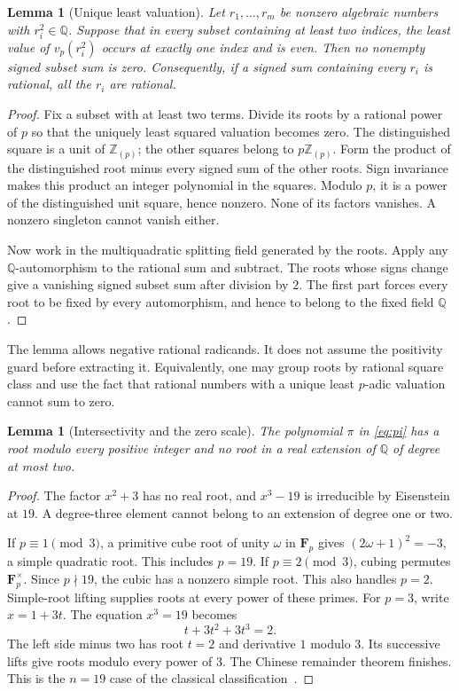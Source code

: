 \documentclass[11pt,a4paper]{article}
\newtheorem{lemma}[theorem]{Lemma}
\theoremstyle{remark}\newtheorem{remark}[theorem]{Remark}
\newcommand{\Z}{\mathbb Z}\newcommand{\Q}{\mathbb Q}\newcommand{\N}{\mathbb N}
\newcommand{\vp}{v_p}\newcommand{\vt}{v_3}
\begin{document}
\begin{lemma}[Unique least valuation]\label{lem:separation}
Let $r_1,\ldots,r_m$ be nonzero algebraic numbers with $r_i^2\in\Q$.
Suppose that in every subset containing at least two indices, the least
value of $\vp(r_i^2)$ occurs at exactly one index and is even. Then no
nonempty signed subset sum is zero. Consequently, if a signed sum
containing every $r_i$ is rational, all the $r_i$ are rational.
\end{lemma}
\begin{proof}
Fix a subset with at least two terms. Divide its roots by a rational
power of $p$ so that the uniquely least squared valuation becomes zero.
The distinguished square is a unit of $\Z_{(p)}$; the other squares
belong to $p\Z_{(p)}$. Form the product of the distinguished root minus
every signed sum of the other roots. Sign invariance makes this product
an integer polynomial in the squares. Modulo $p$, it is a power of the
distinguished unit square, hence nonzero. None of its factors vanishes.
A nonzero singleton cannot vanish either.

Now work in the multiquadratic splitting field generated by the roots.
Apply any $\Q$-automorphism to the rational sum and subtract. The roots
whose signs change give a vanishing signed subset sum after division by
$2$. The first part forces every root to be fixed by every automorphism,
and hence to belong to the fixed field $\Q$.
\end{proof}
The lemma allows negative rational radicands. It does not assume the
positivity guard before extracting it. Equivalently, one may group roots
by rational square class and use the fact that rational numbers with a
unique least $p$-adic valuation cannot sum to zero.

\begin{lemma}[Intersectivity and the zero scale]\label{lem:intersective}
The polynomial $\pi$ in \eqref{eq:pi} has a root modulo every positive
integer and no root in a real extension of $\Q$ of degree at most two.
\end{lemma}
\begin{proof}
The factor $x^2+3$ has no real root, and $x^3-19$ is irreducible by
Eisenstein at $19$. A degree-three element cannot belong to an extension
of degree one or two.

If $p\equiv1\pmod3$, a primitive cube root of unity $\omega$ in
$\mathbf F_p$ gives $(2\omega+1)^2=-3$, a simple quadratic root.
This includes $p=19$. If $p\equiv2\pmod3$, cubing permutes
$\mathbf F_p^\times$. Since $p\nmid19$, the cubic has a nonzero simple
root. This also handles $p=2$. Simple-root lifting supplies roots at
every power of these primes.
For $p=3$, write $x=1+3t$. The equation $x^3=19$ becomes
\[
 t+3t^2+3t^3=2.
\]
The left side minus two has root $t=2$ and derivative $1$ modulo $3$.
Its successive lifts give roots modulo every power of $3$. The Chinese
remainder theorem finishes. This is the $n=19$ case of the classical
classification~\cite{hls}.
\end{proof}
\end{document}
